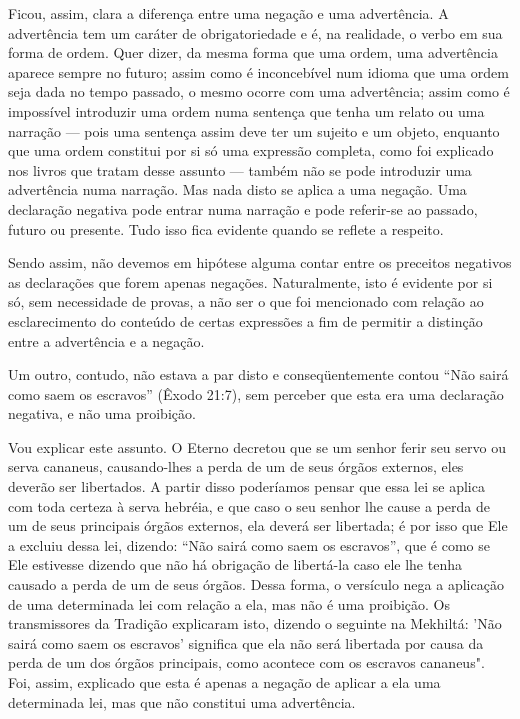 Ficou, assim, clara a diferença entre uma negação e uma advertên­cia. A
advertência tem um caráter de obrigatoriedade e é, na realidade, o verbo
em sua forma de ordem. Quer dizer, da mesma forma que uma ordem, uma
advertência aparece sempre no futuro; assim como é inconcebível num
idioma que uma ordem seja dada no tempo passado, o mesmo ocorre com uma
adver­tência; assim como é impossível introduzir uma ordem numa sentença
que te­nha um relato ou uma narração --- pois uma sentença assim deve
ter um sujeito e um objeto, enquanto que uma ordem constitui por si só
uma expressão com­pleta, como foi explicado nos livros que tratam desse
assunto --- também não se pode introduzir uma advertência numa narração.
Mas nada disto se aplica a uma negação. Uma declaração negativa pode
entrar numa narração e pode referir-se ao passado, futuro ou presente.
Tudo isso fica evidente quando se reflete a respeito.

Sendo assim, não devemos em hipótese alguma contar entre os pre­ceitos
negativos as declarações que forem apenas negações. Naturalmente, isto é
evidente por si só, sem necessidade de provas, a não ser o que foi
menciona­do com relação ao esclarecimento do conteúdo de certas
expressões a fim de permitir a distinção entre a advertência e a
negação.

Um outro, contudo, não estava a par disto e conseqüentemente con­tou
``Não sairá como saem os escravos'' (Êxodo 21:7), sem perceber que esta
era uma declaração negativa, e não uma proibição.

Vou explicar este assunto. O Eterno decretou que se um senhor fe­rir seu
servo ou serva cananeus, causando-lhes a perda de um de seus órgãos
externos, eles deverão ser libertados. A partir disso poderíamos pensar
que es­sa lei se aplica com toda certeza à serva hebréia, e que caso o
seu senhor lhe cause a perda de um de seus principais órgãos externos,
ela deverá ser liberta­da; é por isso que Ele a excluiu dessa lei,
dizendo: ``Não sairá como saem os escravos'', que é como se Ele estivesse
dizendo que não há obrigação de liber­tá-la caso ele lhe tenha causado a
perda de um de seus órgãos. Dessa forma, o versículo nega a aplicação de
uma determinada lei com relação a ela, mas não é uma proibição. Os
transmissores da Tradição explicaram isto, dizendo o se­guinte na
Mekhiltá: 'Não sairá como saem os escravos' significa que ela não será
libertada por causa da perda de um dos órgãos principais, como acontece
com os escravos cananeus". Foi, assim, explicado que esta é apenas a
negação de aplicar a ela uma determinada lei, mas que não constitui uma
advertência.


